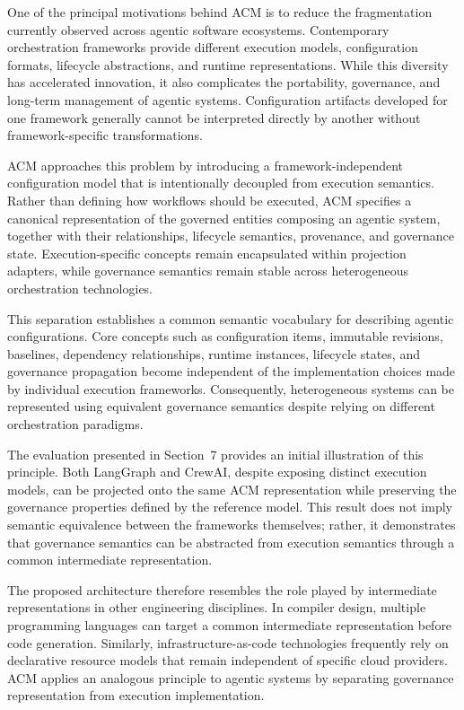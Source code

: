 \documentclass[10pt]{article}
\begin{document}
One of the principal motivations behind ACM is to reduce the fragmentation currently observed across agentic software ecosystems. Contemporary orchestration frameworks provide different execution models, configuration formats, lifecycle abstractions, and runtime representations. While this diversity has accelerated innovation, it also complicates the portability, governance, and long-term management of agentic systems. Configuration artifacts developed for one framework generally cannot be interpreted directly by another without framework-specific transformations.

ACM approaches this problem by introducing a framework-independent configuration model that is intentionally decoupled from execution semantics. Rather than defining how workflows should be executed, ACM specifies a canonical representation of the governed entities composing an agentic system, together with their relationships, lifecycle semantics, provenance, and governance state. Execution-specific concepts remain encapsulated within projection adapters, while governance semantics remain stable across heterogeneous orchestration technologies.

This separation establishes a common semantic vocabulary for describing agentic configurations. Core concepts such as configuration items, immutable revisions, baselines, dependency relationships, runtime instances, lifecycle states, and governance propagation become independent of the implementation choices made by individual execution frameworks. Consequently, heterogeneous systems can be represented using equivalent governance semantics despite relying on different orchestration paradigms.

The evaluation presented in Section~7 provides an initial illustration of this principle. Both LangGraph and CrewAI, despite exposing distinct execution models, can be projected onto the same ACM representation while preserving the governance properties defined by the reference model. This result does not imply semantic equivalence between the frameworks themselves; rather, it demonstrates that governance semantics can be abstracted from execution semantics through a common intermediate representation.

The proposed architecture therefore resembles the role played by intermediate representations in other engineering disciplines. In compiler design, multiple programming languages can target a common intermediate representation before code generation. Similarly, infrastructure-as-code technologies frequently rely on declarative resource models that remain independent of specific cloud providers. ACM applies an analogous principle to agentic systems by separating governance representation from execution implementation.
\end{document}
